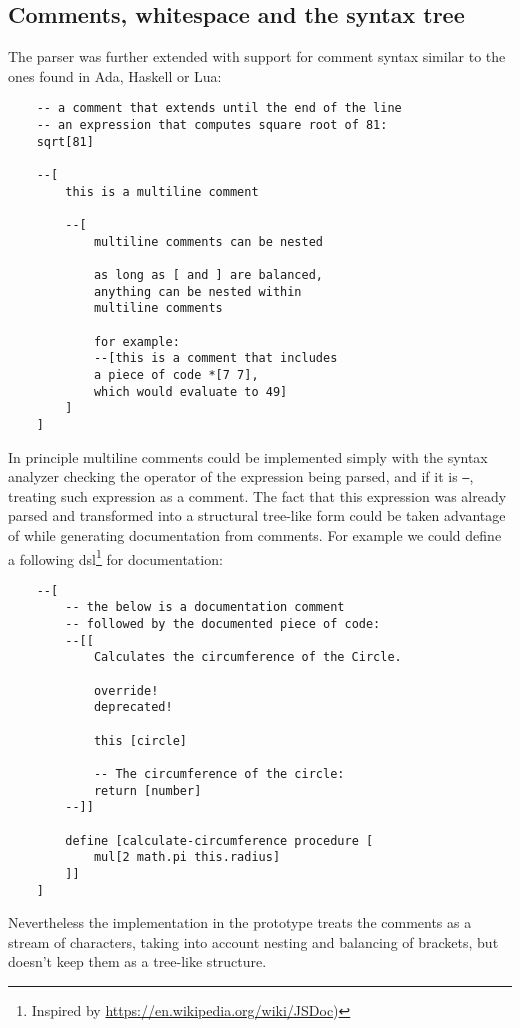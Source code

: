 \subsection{Comments, whitespace and the syntax tree}\label{sub:comments}
The parser was further extended with support for comment syntax similar to the ones found in Ada, Haskell or Lua:
\begin{lstlisting}
    -- a comment that extends until the end of the line
    -- an expression that computes square root of 81:
    sqrt[81]
    
    --[
        this is a multiline comment
        
        --[
            multiline comments can be nested
            
            as long as [ and ] are balanced,
            anything can be nested within
            multiline comments
            
            for example:
            --[this is a comment that includes
            a piece of code *[7 7],
            which would evaluate to 49]
        ]
    ]
\end{lstlisting}

In principle multiline comments could be implemented simply with the syntax analyzer checking the operator of the expression being parsed, and if it is \texttt{--}, treating such expression as a comment. The fact that this expression was already parsed and transformed into a structural tree-like form could be taken advantage of while generating documentation from comments. For example we could define a following \acrlong{dsl}\footnote{Inspired by \url{https://en.wikipedia.org/wiki/JSDoc})} for documentation:
\begin{lstlisting}
    --[
        -- the below is a documentation comment
        -- followed by the documented piece of code:
        --[[
            Calculates the circumference of the Circle.
            
            override!
            deprecated!
            
            this [circle]
            
            -- The circumference of the circle:
            return [number]
        --]]
        
        define [calculate-circumference procedure [
            mul[2 math.pi this.radius]
        ]]
    ]
\end{lstlisting}

Nevertheless the implementation in the prototype treats the comments as a stream of characters, taking into account nesting and balancing of brackets, but doesn't keep them as a tree-like structure.

